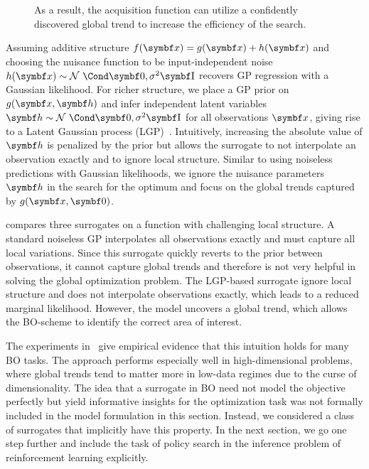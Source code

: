 \begin{figure}[t]
    \centering
    \caption{
        \label{fig:bo:posterior}
        As a result, the acquisition function can utilize a confidently discovered global trend to increase the efficiency of the search.
    }
\end{figure}
Assuming additive structure $f(\mat{x}) = g(\mat{x}) + h(\mat{x})$ and choosing the nuisance function to be input-independent noise $h(\mat{x}) \sim \Gaussian{\mat{0}, \sigma^2 \Eye}$ recovers GP regression with a Gaussian likelihood.
For richer structure, we place a GP prior on $g(\mat{x}, \mat{h})$ and infer independent latent variables $\mat{h} \sim \Gaussian{\mat{0}, \sigma^2 \Eye}$ for all observations $\mat{x}$, giving rise to a Latent Gaussian process (LGP)~\parencite{pfingsten_nonstationary_2006,wang_gaussian_2012,yousefi_unsupervised_2016,bodin_latent_2017}.
Intuitively, increasing the absolute value of $\mat{h}$ is penalized by the prior but allows the surrogate to not interpolate an observation exactly and to ignore local structure.
Similar to using noiseless predictions with Gaussian likelihoods, we ignore the nuisance parameters $\mat{h}$ in the search for the optimum and focus on the global trends captured by $g(\mat{x}, \mat{0})$.

 compares three surrogates on a function with challenging local structure.
A standard noiseless GP interpolates all observations exactly and must capture all local variations.
Since this surrogate quickly reverts to the prior between observations, it cannot capture global trends and therefore is not very helpful in solving the global optimization problem.
The LGP-based surrogate ignore local structure and does not interpolate observations exactly, which leads to a reduced marginal likelihood.
However, the model uncovers a global trend, which allows the BO-scheme to identify the correct area of interest.

The experiments in~\parencite{bodin_modulating_2020} give empirical evidence that this intuition holds for many BO tasks.
The approach performs especially well in high-dimensional problems, where global trends tend to matter more in low-data regimes due to the curse of dimensionality.
The idea that a surrogate in BO need not model the objective perfectly but yield informative insights for the optimization task was not formally included in the model formulation in this section.
Instead, we considered a class of surrogates that implicitly have this property.
In the next section, we go one step further and include the task of policy search in the inference problem of reinforcement learning explicitly.


